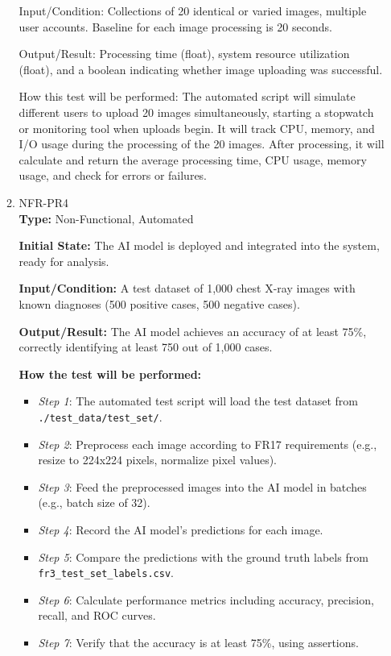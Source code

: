 \documentclass[12pt, titlepage]{article}
\begin{document}
\begin{enumerate}
\begin{enumerate}
  Input/Condition: Collections of 20 identical or varied images, multiple user accounts. Baseline for each image processing is 20 seconds.
  
  Output/Result: Processing time (float), system resource utilization (float), and a boolean indicating whether image uploading was successful.
  
  How this test will be performed: The automated script will simulate different users to upload 20 images simultaneously, starting a stopwatch or monitoring tool when uploads begin. It will track CPU, memory, and I/O usage during the processing of the 20 images. After processing, it will calculate and return the average processing time, CPU usage, memory usage, and check for errors or failures.
  
  \item{NFR-PR4\\}\label{NFR-PR4}
  \textbf{Type:} Non-Functional, Automated
  
  \textbf{Initial State:} The AI model is deployed and integrated into the system, ready for analysis.
  
  \textbf{Input/Condition:} A test dataset of 1,000 chest X-ray images with known diagnoses (500 positive cases, 500 negative cases).
  
  \textbf{Output/Result:} The AI model achieves an accuracy of at least 75\%, correctly identifying at least 750 out of 1,000 cases.
  
  \textbf{How the test will be performed:}
  \begin{itemize}
    \item \textit{Step 1}: The automated test script will load the test dataset from \texttt{./test\_data/test\_set/}.
    \item \textit{Step 2}: Preprocess each image according to FR17 requirements (e.g., resize to 224x224 pixels, normalize pixel values).
    \item \textit{Step 3}: Feed the preprocessed images into the AI model in batches (e.g., batch size of 32).
    \item \textit{Step 4}: Record the AI model's predictions for each image.
    \item \textit{Step 5}: Compare the predictions with the ground truth labels from \texttt{fr3\_test\_set\_labels.csv}.
    \item \textit{Step 6}: Calculate performance metrics including accuracy, precision, recall, and ROC curves.
    \item \textit{Step 7}: Verify that the accuracy is at least 75\%, using assertions.
  \end{itemize}
  

\end{enumerate}
\end{enumerate}
\end{document}
